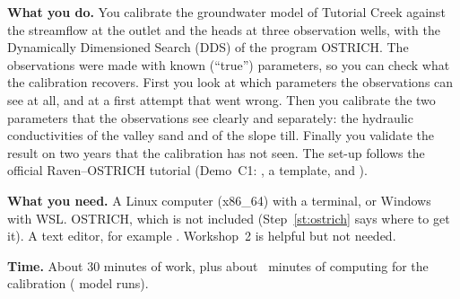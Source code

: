 \begin{goal}
\textbf{What you do.} You calibrate the groundwater model of Tutorial Creek against the streamflow at the outlet and the
heads at three observation wells, with the Dynamically Dimensioned Search (DDS) of the program OSTRICH. The observations
were made with known (``true'') parameters, so you can check what the calibration recovers. First you look at which
parameters the observations can see at all, and at a first attempt that went wrong. Then you calibrate the two parameters
that the observations see clearly and separately: the hydraulic conductivities of the valley sand and of the slope till.
Finally you validate the result on two years that the calibration has not seen. The set-up follows the official
Raven--OSTRICH tutorial (Demo~C1: , a template,  and ).

\textbf{What you need.} A Linux computer (x86\_64) with a terminal, or Windows with WSL. OSTRICH, which is not included
(Step~\ref{st:ostrich} says where to get it). A text editor, for example . Workshop~2 is helpful but not needed.

\textbf{Time.} About 30 minutes of work, plus about ~minutes of computing for the calibration
( model runs).
\end{goal}
